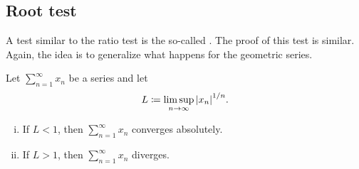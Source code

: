 
\subsection{Root test}

A test similar to the ratio test is the so-called
\emph{}.  The proof of this test is similar.
Again, the idea is to generalize what happens for the geometric series.

\begin{prop}
Let $\sum_{n=1}^\infty x_n$ be a series and let
\begin{equation*}
L \coloneqq \limsup_{n\to\infty} {\lvert {x_n} \rvert}^{1/n} .
\end{equation*}
\begin{enumerate}[(i)]
\item If $L < 1$, then $\sum_{n=1}^\infty x_n$ converges absolutely.
\item If $L > 1$, then $\sum_{n=1}^\infty x_n$ diverges.
\end{enumerate}
\end{prop}

